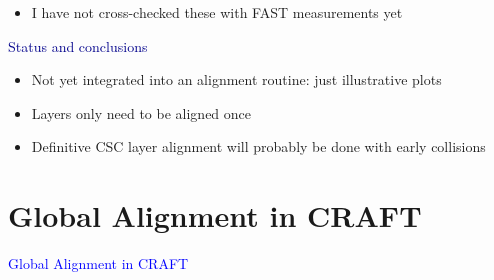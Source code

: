 \documentclass[compress]{beamer}
\begin{document}
\begin{frame}
\vspace{0.1 cm}
\hspace{-0.45 cm} \begin{minipage}{0.9\linewidth}
\begin{itemize}
\item I have not cross-checked these with FAST measurements yet
\end{itemize}
\end{minipage}

\vspace{0.3 cm}
\hspace{-0.83 cm} \textcolor{darkblue}{\Large Status and conclusions}

\begin{itemize}
\item Not yet integrated into an alignment routine: just illustrative plots
\item Layers only need to be aligned once
\item Definitive CSC layer alignment will probably be done with early \mbox{collisions\hspace{-1 cm}}
\end{itemize}
\end{frame}

\section*{Global Alignment in CRAFT}
\begin{frame}
\begin{center}
\Huge \textcolor{blue}{Global Alignment in CRAFT}
\end{center}
\end{frame}
\end{document}
